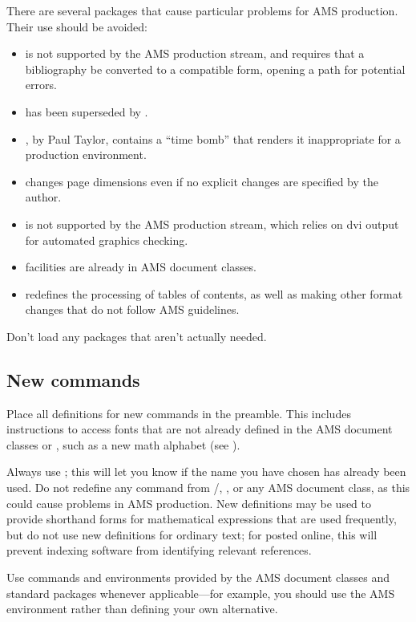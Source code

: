There are several packages that cause particular problems for AMS
production.  Their use should be avoided:
\begin{itemize}
\item {} is not supported by the AMS production stream, and
  requires that a bibliography be converted to a compatible form, opening
  a path for potential errors.
\item {} has been superseded by .
\item {}, by Paul Taylor, contains a ``time bomb'' that
  renders it inappropriate for a production environment.
\item {} changes page dimensions even if no explicit
  changes are specified by the author.
\item {} is not supported by the AMS production stream,
  which relies on dvi output for automated graphics checking.
\item {} facilities are already in AMS document classes.
\item {} redefines the processing of tables of contents, as
  well as making other format changes that do not follow AMS guidelines.
\end{itemize}

Don't load any packages that aren't actually needed.


\subsection{New commands}
Place all definitions for new commands in the preamble.  This includes
instructions to access fonts that are not already defined in the AMS
document classes or , such as a new math alphabet (see
\cite{AMG}).

Always use ; this will let you know if the name you
have chosen has already been used.  Do not redefine any command from
\latex/, , or any AMS document class, as this could cause
problems in AMS production.  New definitions may be used to provide
shorthand forms for mathematical expressions that are used frequently,
but do not use new definitions for ordinary text; for
 posted online, this will
prevent indexing software from identifying relevant references.

Use commands and environments provided by the AMS document classes
and standard packages whenever applicable---for example, you should
use the AMS  environment rather than defining your own
alternative.

